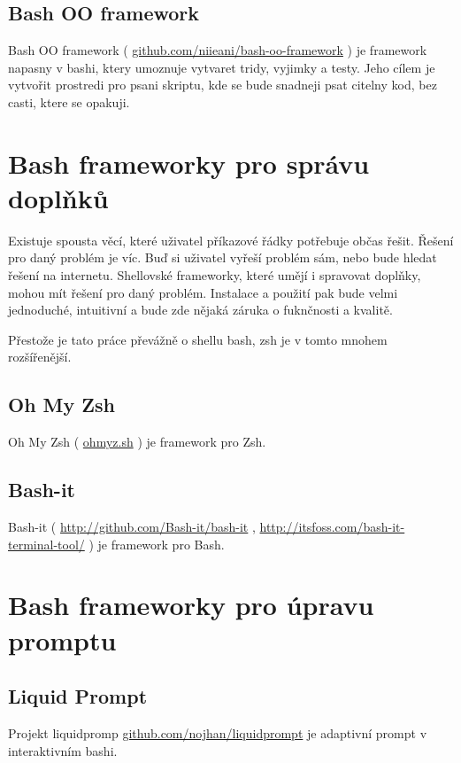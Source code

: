 \documentclass[thesis=M,czech]{FITthesis}[2012/06/26]
\begin{document}
\subsection{Bash OO framework}
Bash OO framework ( \url{github.com/niieani/bash-oo-framework} ) je framework napasny v bashi, ktery umoznuje vytvaret tridy, vyjimky a testy. Jeho cílem je vytvořit prostredi pro psani skriptu, kde se bude snadneji psat citelny kod, bez casti, ktere se opakuji.

%
%
%
%
%

\section{Bash frameworky pro správu doplňků}

Existuje spousta věcí, které uživatel příkazové řádky potřebuje občas řešit. Řešení pro daný problém je víc. Buď si uživatel vyřeší problém sám, nebo bude hledat řešení na internetu. Shellovské frameworky, které umějí i spravovat doplňky, mohou mít řešení pro daný problém. Instalace a použití pak bude velmi jednoduché, intuitivní a bude zde nějaká záruka o fuknčnosti a kvalitě.

Přestože je tato práce převážně o shellu bash, zsh je v tomto mnohem rozšířenější.

%
%
%
\subsection{Oh My Zsh}

Oh My Zsh ( \url{ohmyz.sh} ) je framework pro Zsh.

%
%
%
\subsection{Bash-it}

Bash-it ( \url{http://github.com/Bash-it/bash-it} , \url{http://itsfoss.com/bash-it-terminal-tool/} ) je framework pro Bash.

%
%
%

%
%
%
\section{Bash frameworky pro úpravu promptu}

\subsection{Liquid Prompt}

Projekt liquidpromp \url{github.com/nojhan/liquidprompt} je adaptivní prompt v interaktivním bashi.
\end{document}
